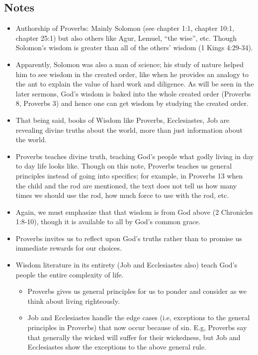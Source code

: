 \subsection*{Notes}
\begin{itemize}
  \item{Authorship of Proverbs: Mainly Solomon (see chapter 1:1, chapter
  10:1, chapter 25:1) but also others like Agur, Lemuel, ``the wise'', etc.
  Though Solomon's wisdom is greater than all of the others' wisdom (1 Kings
  4:29-34).}
  \item{Apparently, Solomon was also a man of science; his study of nature
  helped him to see wisdom in the created order, like when he provides an
  analogy to the ant to explain the value of hard work and diligence.  As
  will be seen in the later sermons, God's wisdom is baked into the whole
  created order (Proverbs 8, Proverbs 3) and hence one can get wisdom by
  studying the created order.}
  \item{That being said, books of Wisdom like Proverbs, Ecclesiastes, Job are
  revealing divine truths about the world, more than just information about
  the world.}
  \item{Proverbs teaches divine truth, teaching God's people what godly
  living in day to day life looks like.  Though on this note, Proverbs
  teaches us general principles instead of going into specifics; for example,
  in Proverbs 13 when the child and the rod are mentioned, the text does not
  tell us how many times we should use the rod, how much force to use with
  the rod, etc.}
  \item{Again, we must emphasize that that wisdom is from God above (2
  Chronicles 1:8-10), though it is available to all by God's common grace.}
  \item{Proverbs invites us to reflect upon God's truths rather than to
  promise us immediate rewards for our choices.}
  \item{Wisdom literature in its entirety (Job and Ecclesiastes also) teach God's people the entire complexity of life.
  \begin{itemize}
    \item{Proverbs gives us general principles for us to ponder and consider as we think about living righteously.}
    \item{Job and Ecclesiastes handle the edge cases (i.e, exceptions to the
    general principles in Proverbs) that now occur because of sin.  E.g,
    Proverbs say that generally the wicked will suffer for their wickedness,
    but Job and Ecclesiastes show the exceptions to the above general rule.}

\end{itemize}}
\end{itemize}

